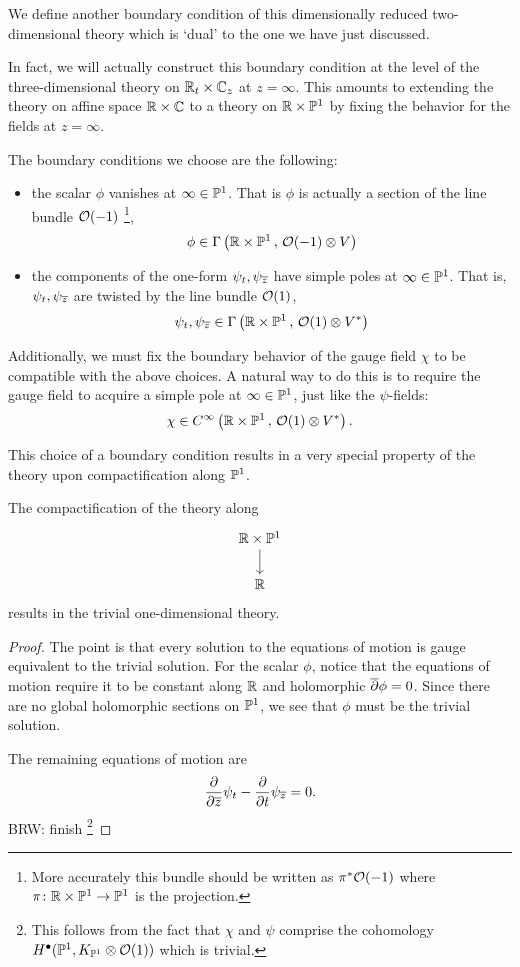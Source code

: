 \documentclass[11pt]{amsart}
\def\brian#1{{\textcolor{blue!65!red}{BRW: {#1}}}}
\begin{document}
We define another boundary condition of this dimensionally reduced two-dimensional theory which is `dual' to the one we have just discussed. 

In fact, we will actually construct this boundary condition at the level of the three-dimensional theory on $\mathbb R_t \times \mathbb C_z$ at $z = \infty$. 
This amounts to extending the theory on affine space $\mathbb R \times \mathbb C$ to a theory on $\mathbb R \times \mathbb P^1$ by fixing the behavior for the fields at $z = \infty$. 

The boundary conditions we choose are the following:
\begin{itemize}
\item the scalar $\phi$ vanishes at $\infty \in \mathbb P^1$. 
That is $\phi$ is actually a section of the line bundle $\mathcal O(-1)$ \footnote{More accurately this bundle should be written as $\pi^* \mathcal O(-1)$ where $\pi \colon \mathbb R \times \mathbb P^1 \to \mathbb P^1$ is the projection.}, 
\[
\phi \in \Gamma \left(\mathbb R \times \mathbb P^1 \, , \, \mathcal O(-1) \otimes V \right) 
\]
\item the components of the one-form $\psi_{t}, \psi_{{\overline{z}}}$ have simple poles at $\infty \in \mathbb P^1$.
That is, $\psi_t,\psi_{{\overline{z}}}$ are twisted by the line bundle $\mathcal O(1)$,
\[
\psi_{t}, \psi_{{\overline{z}}}\in \Gamma\left(\mathbb R \times \mathbb P^1 \, , \, \mathcal O(1) \otimes V^*\right)
\]
\end{itemize}

Additionally, we must fix the boundary behavior of the gauge field $\chi$ to be compatible with the above choices.
A natural way to do this is to require the gauge field to acquire a simple pole at $\infty \in \mathbb P^1$, just like the $\psi$-fields:
\[
\chi \in C^\infty\left(\mathbb R \times \mathbb P^1 \, , \, \mathcal O(1) \otimes V^*\right) .
\]

This choice of a boundary condition results in a very special property of the theory upon compactification along $\mathbb P^1$.

\begin{lem}\label{lem:compactP1}
The compactification of the theory along 
\[
\begin{tikzcd}
\RR \times \PP^1 \ar[d] \\ \RR
\end{tikzcd}
\]
results in the trivial one-dimensional theory. 
\end{lem}
\begin{proof}
The point is that every solution to the equations of motion is gauge equivalent to the trivial solution. 
For the scalar $\phi$, notice that the equations of motion require it to be constant along $\mathbb R$ and holomorphic $\overline{\partial} \phi = 0$. 
Since there are no global holomorphic sections on $\mathbb P^1$, we see that $\phi$ must be the trivial solution. 

The remaining equations of motion are
\[
\frac{\partial}{\partial {\overline{z}}} \psi_t - \frac{\partial}{\partial t} \psi_{\overline{z}} = 0 .
\]
\brian{finish} \footnote{This follows from the fact that $\chi$ and $\psi$ comprise the cohomology $H^\bullet(\mathbb P^1, K_{\mathbb P^1} \otimes \mathcal O(1))$ which is trivial.}


\end{proof}
\end{document}
